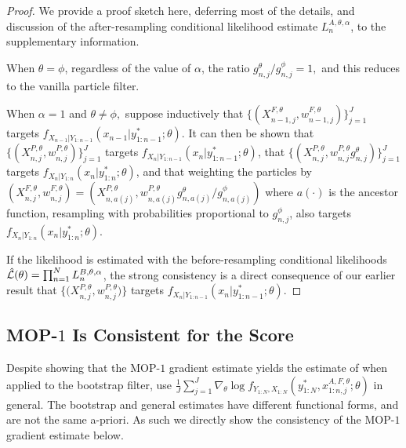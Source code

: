 \documentclass[9pt,twocolumn,twoside]{pnas-new}
\begin{document}
\begin{proof}
    We provide a proof sketch here, deferring most of the details, and discussion of the after-resampling conditional likelihood estimate $L_n^{A,\theta,\alpha}$, to the supplementary information. 
    
    When $\theta=\phi$, regardless of the value of $\alpha$, the ratio ${g_{n,j}^\theta}/{g_{n,j}^\phi}=1,$ and this reduces to the vanilla particle filter.
    
    When $\alpha=1$ and $\theta\neq\phi,$ suppose inductively that $\{(X^{F,\theta}_{n-1,j},w^{F,\theta}_{n-1,j})\}_{j=1}^J$ targets $f_{X_{n-1}|Y_{1:n-1}}(x_{n-1}|y^*_{1:n-1};\theta)$.
    It can then be shown that $\{(X^{P,\theta}_{n,j},w^{P,\theta}_{n,j})\}_{j=1}^J$ targets $f_{X_{n}|Y_{1:n-1}}(x_{n}|y^*_{1:n-1};\theta)$, that $\{(X^{P,\theta}_{n,j},w^{P,\theta}_{n,j} g^\theta_{n,j} )\}_{j=1}^J$ targets  $f_{X_{n}|Y_{1:n}}(x_{n}|y^*_{1:n};\theta)$, and that weighting the particles by $(X^{F,\theta}_{n,j},w^{F,\theta}_{n,j}) = (X^{P,\theta}_{n,a(j)}, w^{P,\theta}_{n,a(j)} g^\theta_{n,a(j)}/ g^\phi_{n,a(j)})$ where $a(\cdot)$ is the ancestor function,
    resampling with probabilities proportional to $g^\phi_{n,j}$, also targets $f_{X_{n}|Y_{1:n}}(x_{n}|y^*_{1:n};\theta)$.

    If the likelihood is estimated with the before-resampling conditional likelihoods $\hat{\mathcal{L}}(\theta) = \prod_{n=1}^N L_n^{B,\theta,\alpha}$, the strong consistency is a direct consequence of our earlier result that $\{ \big(X^{P,\theta}_{n,j},w^{P,\theta}_{n,j}\big) \}$ targets $f_{X_{n}|Y_{1:n-1}}(x_{n}|y^*_{1:n-1};\theta)$. 
\end{proof}




\subsection{MOP-$1$ Is Consistent for the Score}

Despite showing that the MOP-$1$ gradient estimate yields the estimate of \cite{poyiadjis11, scibior21} when applied to the bootstrap filter, \cite{poyiadjis11, scibior21} use $\frac{1}{J}\sum_{j=1}^J \nabla_\theta \log f_{Y_{1:N}, X_{1:N}}\left(y_{1:N}^* , x_{1:n,j}^{A, F,\theta}; \theta\right)$ in general. The bootstrap and general estimates have different functional forms, and are not the same a-priori. As such we directly show the consistency of the MOP-$1$ gradient estimate below. 
\end{document}
